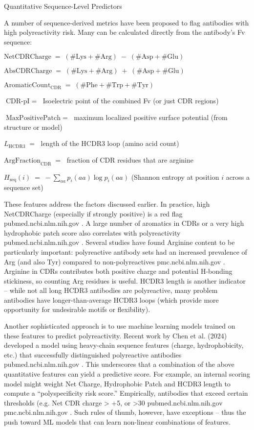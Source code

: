 Quantitative Sequence-Level Predictors

A number of sequence-derived metrics have been proposed to flag antibodies with high polyreactivity risk. Many can be calculated directly from the antibody’s Fv sequence:

$\text{NetCDRCharge} \;=\; (\#\text{Lys} + \#\text{Arg}) \;-\; (\#\text{Asp} + \#\text{Glu})$

$\text{AbsCDRCharge} \;=\; (\#\text{Lys} + \#\text{Arg}) \;+\; (\#\text{Asp} + \#\text{Glu})$

$\text{AromaticCount}_{\mathrm{CDR}} \;=\; (\#\text{Phe} + \#\text{Trp} + \#\text{Tyr})$

$\text{CDR-pI} \;=\;$ Isoelectric point of the combined Fv (or just CDR regions)

$\text{MaxPositivePatch} \;=\;$ maximum localized positive surface potential (from structure or model)

$L_{\mathrm{HCDR3}} \;=\;$ length of the HCDR3 loop (amino acid count)

$\text{ArgFraction}_{\mathrm{CDR}} \;=\;$ fraction of CDR residues that are arginine

$H_{\mathrm{seq}}(i) \;=\; -\sum_{aa} p_{i}(aa)\log p_{i}(aa)$ (Shannon entropy at position $i$ across a sequence set)


These features address the factors discussed earlier. In practice, high NetCDRCharge (especially if strongly positive) is a red flag
pubmed.ncbi.nlm.nih.gov
. A large number of aromatics in CDRs or a very high hydrophobic patch score also correlates with polyreactivity
pubmed.ncbi.nlm.nih.gov
. Several studies have found Arginine content to be particularly important: polyreactive antibody sets had an increased prevalence of Arg (and also Tyr) compared to non-polyreactives
pmc.ncbi.nlm.nih.gov
. Arginine in CDRs contributes both positive charge and potential H-bonding stickiness, so counting Arg residues is useful. HCDR3 length is another indicator – while not all long HCDR3 antibodies are polyreactive, many problem antibodies have longer-than-average HCDR3 loops (which provide more opportunity for undesirable motifs or flexibility).

Another sophisticated approach is to use machine learning models trained on these features to predict polyreactivity. Recent work by Chen et al. (2024) developed a model using heavy-chain sequence features (charge, hydrophobicity, etc.) that successfully distinguished polyreactive antibodies
pubmed.ncbi.nlm.nih.gov
. This underscores that a combination of the above quantitative features can yield a predictive score. For example, an internal scoring model might weight Net Charge, Hydrophobic Patch and HCDR3 length to compute a “polyspecificity risk score.” Empirically, antibodies that exceed certain thresholds (e.g. Net CDR charge > +5, or >30%
pubmed.ncbi.nlm.nih.gov
pmc.ncbi.nlm.nih.gov
. Such rules of thumb, however, have exceptions – thus the push toward ML models that can learn non-linear combinations of features.

